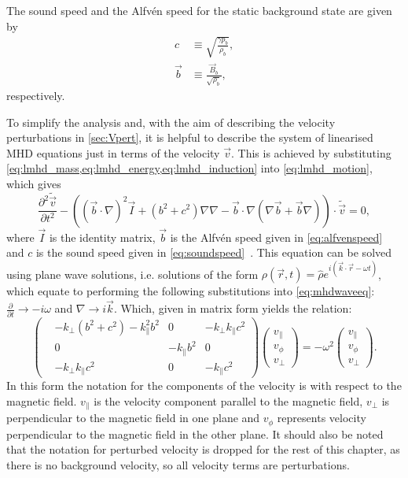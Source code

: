 The sound speed and the Alfv\'en speed for the static background state are given by 
\begin{align}
    c &\equiv \sqrt{\frac{\gamma p_b}{\rho_b}},\label{eq:soundspeed}\\
    \vec{b} &\equiv \frac{\vec{B}_b}{\sqrt{\rho_b}},\label{eq:alfvenspeed}
\end{align}
respectively.

To simplify the analysis and, with the aim of describing the velocity perturbations in \cref{sec:Vpert}, it is helpful to describe the system of linearised MHD equations just in terms of the velocity $\vec{v}$.
This is achieved by substituting \cref{eq:lmhd_mass,eq:lmhd_energy,eq:lmhd_induction} into \cref{eq:lmhd_motion}, which gives
\begin{equation}
    \frac{\partial^2 \tilde{\vec{v}}}{\partial t^2} - \left( (\vec{b} \cdot \nabla)^2 \vec{I} + (b^2 + c^2) \nabla\nabla - \vec{b} \cdot \nabla (\nabla\vec{b} + \vec{b}\nabla) \right) \cdot \tilde{\vec{v}} = 0,\label{eq:mhdwaveeq}
\end{equation}
where $\vec{I}$ is the identity matrix, $\vec{b}$ is the Alfv\'en speed given in \cref{eq:alfvenspeed} and $c$ is the sound speed given in \cref{eq:soundspeed}~\citep{goedbloed2004}.
This equation can be solved using plane wave solutions, i.e. solutions of the form $\rho(\vec{r}, t) = \hat{\rho} e^{i(\vec{k}\cdot\vec{r} - \omega t)}$, which equate to performing the following substitutions into \cref{eq:mhdwaveeq}: $\frac{\partial}{\partial t} \rightarrow - i \omega$ and $\nabla \rightarrow i \vec{k}$.
Which, given in matrix form yields the relation:
\begin{equation}
\begin{pmatrix}
    &-k_\perp(b^2+c^2)-k_\parallel^2 b^2			& 0			& -k_\perp k_\parallel c^2\\
    & 0									&-k_\parallel b^2	& 0\\
    &-k_\perp k_\parallel c^2					& 0			& -k_\parallel c^2
\end{pmatrix}
\begin{pmatrix}
v_\parallel\\
v_\phi\\
v_\perp
\end{pmatrix}
= - \omega^2
\begin{pmatrix}
v_\parallel\\
v_\phi\\
v_\perp
\end{pmatrix}.\label{eq:eigenvalue}
\end{equation}
In this form the notation for the components of the velocity is with respect to the magnetic field. $v_\parallel$ is the velocity component parallel to the magnetic field, $v_\perp$ is perpendicular to the magnetic field in one plane and $v_\phi$ represents velocity perpendicular to the magnetic field in the other plane. It should also be noted that the notation for perturbed velocity is dropped for the rest of this chapter, as there is no background velocity, so all velocity terms are perturbations.

